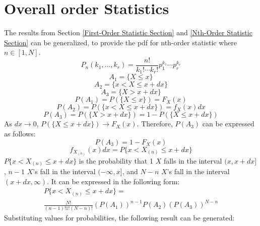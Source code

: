 \documentclass[conference]{IEEEtran}
\begin{document}
\section{Overall order Statistics}
The results from Section \ref{First-Order Statistic Section} and \ref{Nth-Order Statistic Section} can be generalized, to provide the pdf for nth-order statistic where $n\in[1,N]$.
\begin{equation}
P_n(k_1,...,k_r)=\frac{n!}{k_1! \cdots k_r!}p_1^{k_1} \cdots p_r^{k_r}
\end{equation}
\begin{equation}
A_1 = \{X \leq x\}
\end{equation}
\begin{equation}
A_2 = \{x < X \leq x + dx\}
\end{equation}
\begin{equation}
A_3 = \{X > x + dx\}
\end{equation}
\begin{equation}
P(A_1) = P(\{X \leq x\}) = F_X(x)
\end{equation}
\begin{equation}
P(A_2) = P(\{x < X \leq x + dx\}) = f_X(x)dx
\end{equation}
\begin{equation}
P(A_3) = P(\{X > x + dx\}) = 1 - P(\{X \leq x + dx\})
\end{equation}
As $dx \rightarrow 0$, $P(\{X \leq x + dx\}) \rightarrow F_X(x)$. Therefore, $P(A_3)$ can be expressed as follows:
\begin{equation}
P(A_3) = 1 - F_X(x)
\end{equation}
\begin{equation}
f_{X_{(n)}}(x)dx = P\{x < X_{(n)} \leq x + dx\}
\end{equation}
$P\{x < X_{(n)} \leq x + dx\}$ is the probability that 1 $X$ falls in the interval $(x, x+dx]$, $n-1$ $X$'s fall in the interval $(-\infty, x]$, and $N-n$ $X$'s fall in the interval $(x+dx, \infty)$. It can be expressed in the following form:
\begin{equation}
\begin{gathered}
P\{x < X_{(n)} \leq x + dx\}=\\
\frac{N!}{(n-1)!1!(N-n)!}(P(A_1))^{n-1}P(A_2)(P(A_3))^{N-n}
\end{gathered}
\end{equation}
Substituting values for probabilities, the following result can be generated:
\end{document}
